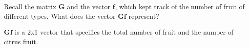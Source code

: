 Recall the matrix $\boldsymbol{G}$ and the vector $\boldsymbol{f}$, which kept track of the number of fruit of different types. What does the vector $\boldsymbol{Gf}$ represent?

\begin{solution}
$\boldsymbol{Gf}$ is a 2x1 vector that specifies the total number of fruit and the number of citrus fruit.
\end{solution}